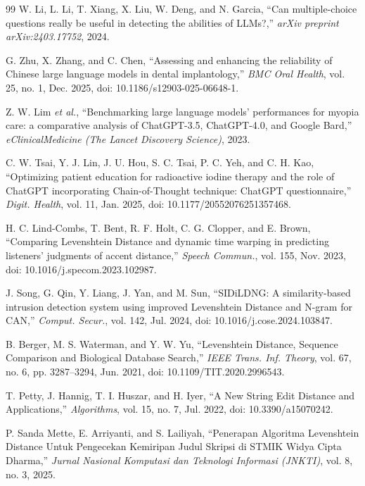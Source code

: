 \documentclass[10pt,a4paper]{article}
\begin{document}
\begin{thebibliography}{99}
W. Li, L. Li, T. Xiang, X. Liu, W. Deng, and N. Garcia, ``Can multiple-choice questions really be useful in detecting the abilities of LLMs?,'' \textit{arXiv preprint arXiv:2403.17752}, 2024.

G. Zhu, X. Zhang, and C. Chen, ``Assessing and enhancing the reliability of Chinese large language models in dental implantology,'' \textit{BMC Oral Health}, vol. 25, no. 1, Dec. 2025, doi: 10.1186/s12903-025-06648-1.

Z. W. Lim \textit{et al.}, ``Benchmarking large language models' performances for myopia care: a comparative analysis of ChatGPT-3.5, ChatGPT-4.0, and Google Bard,'' \textit{eClinicalMedicine (The Lancet Discovery Science)}, 2023.

C. W. Tsai, Y. J. Lin, J. U. Hou, S. C. Tsai, P. C. Yeh, and C. H. Kao, ``Optimizing patient education for radioactive iodine therapy and the role of ChatGPT incorporating Chain-of-Thought technique: ChatGPT questionnaire,'' \textit{Digit. Health}, vol. 11, Jan. 2025, doi: 10.1177/20552076251357468.

H. C. Lind-Combs, T. Bent, R. F. Holt, C. G. Clopper, and E. Brown, ``Comparing Levenshtein Distance and dynamic time warping in predicting listeners' judgments of accent distance,'' \textit{Speech Commun.}, vol. 155, Nov. 2023, doi: 10.1016/j.specom.2023.102987.

J. Song, G. Qin, Y. Liang, J. Yan, and M. Sun, ``SIDiLDNG: A similarity-based intrusion detection system using improved Levenshtein Distance and N-gram for CAN,'' \textit{Comput. Secur.}, vol. 142, Jul. 2024, doi: 10.1016/j.cose.2024.103847.

B. Berger, M. S. Waterman, and Y. W. Yu, ``Levenshtein Distance, Sequence Comparison and Biological Database Search,'' \textit{IEEE Trans. Inf. Theory}, vol. 67, no. 6, pp. 3287--3294, Jun. 2021, doi: 10.1109/TIT.2020.2996543.

T. Petty, J. Hannig, T. I. Huszar, and H. Iyer, ``A New String Edit Distance and Applications,'' \textit{Algorithms}, vol. 15, no. 7, Jul. 2022, doi: 10.3390/a15070242.

P. Sanda Mette, E. Arriyanti, and S. Lailiyah, ``Penerapan Algoritma Levenshtein Distance Untuk Pengecekan Kemiripan Judul Skripsi di STMIK Widya Cipta Dharma,'' \textit{Jurnal Nasional Komputasi dan Teknologi Informasi (JNKTI)}, vol. 8, no. 3, 2025.


\end{thebibliography}
\end{document}
